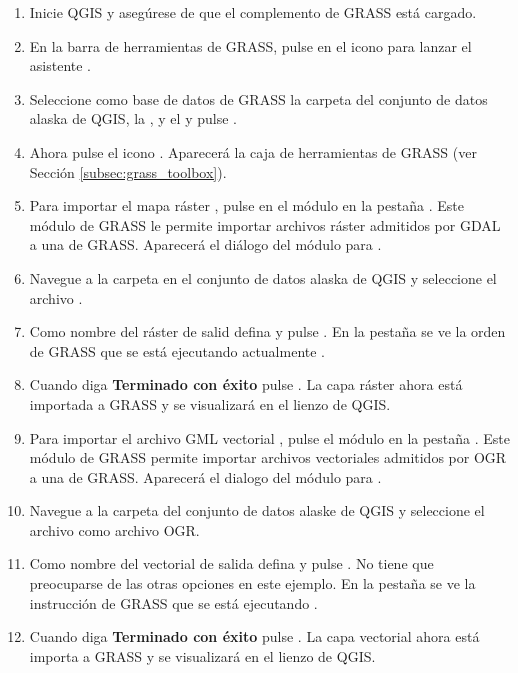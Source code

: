 \begin{enumerate}
  \item Inicie QGIS y asegúrese de que el complemento de GRASS está cargado.
  \item En la barra de herramientas de GRASS, pulse en el icono 
   para lanzar el asistente
  .
  \item Seleccione como base de datos de GRASS la carpeta  del conjunto 
  de datos alaska de QGIS, la , y el  
   y pulse .
  \item Ahora pulse el icono . Aparecerá la caja de herramientas de 
  GRASS (ver Sección \ref{subsec:grass_toolbox}).
  \item Para importar el mapa ráster , pulse en el módulo 
   en la pestaña 
  . Este módulo de GRASS le permite importar archivos ráster admitidos por GDAL a una 
   de GRASS. Aparecerá el diálogo del módulo para .
  \item Navegue a la carpeta  en el conjunto de datos alaska de QGIS y seleccione el archivo .
  \item Como nombre del ráster de salid defina  y pulse 
  . En la pestaña  se ve la orden de GRASS que se está ejecutando actualmente 
  .
  \item Cuando diga \textbf{Terminado con éxito} pulse . 
  La capa ráster  ahora está importada a GRASS y se visualizará en el lienzo de QGIS.
  \item Para importar el archivo GML vectorial , pulse el módulo 
   en la pestaña . Este módulo de GRASS permite importar archivos vectoriales admitidos 
  por OGR a una  de GRASS. Aparecerá el dialogo del módulo para
  .
  \item Navegue a la carpeta  del conjunto de datos alaske de QGIS y seleccione el archivo  como archivo OGR.
  \item Como nombre del vectorial de salida defina  y pulse 
  . No tiene que preocuparse 
  de las otras opciones en este ejemplo. En la pestaña  se ve la instrucción de GRASS que se está ejecutando
  .
  \item Cuando diga \textbf{Terminado con éxito} pulse . 
  La capa vectorial  ahora está importa a GRASS y se visualizará en el lienzo de QGIS.
\end{enumerate}


